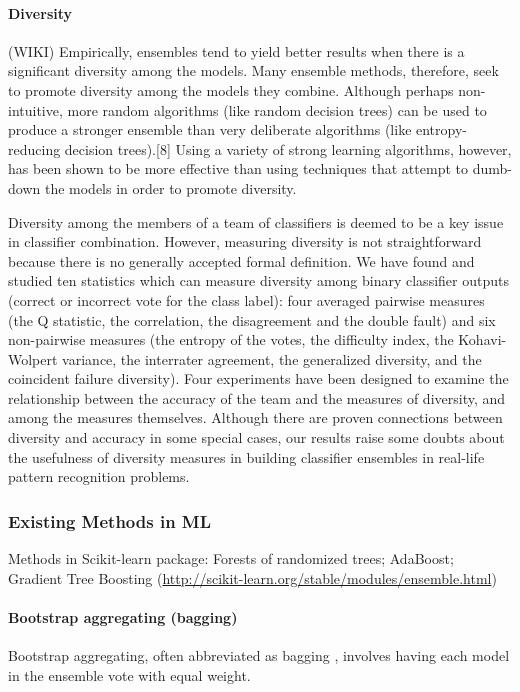 \paragraph{Diversity}

(WIKI) Empirically, ensembles tend to yield better results when there is a significant diversity among the models. Many ensemble methods, therefore, seek to promote diversity among the models they combine. Although perhaps non-intuitive, more random algorithms (like random decision trees) can be used to produce a stronger ensemble than very deliberate algorithms (like entropy-reducing decision trees).[8] Using a variety of strong learning algorithms, however, has been shown to be more effective than using techniques that attempt to dumb-down the models in order to promote diversity.


\cite{kuncheva2003measures} Diversity among the members of a team of classifiers is deemed to be a key issue in classifier
combination. However, measuring diversity is not straightforward because there is no generally accepted formal
definition. We have found and studied ten statistics which can measure diversity among binary classifier outputs
(correct or incorrect vote for the class label): four averaged pairwise measures (the Q statistic, the correlation,
the disagreement and the double fault) and six non-pairwise measures (the entropy of the votes, the difficulty
index, the Kohavi-Wolpert variance, the interrater agreement, the generalized diversity, and the coincident failure
diversity). Four experiments have been designed to examine the relationship between the accuracy of the team and
the measures of diversity, and among the measures themselves. Although there are proven connections between
diversity and accuracy in some special cases, our results raise some doubts about the usefulness of diversity
measures in building classifier ensembles in real-life pattern recognition problems.


\subsubsection{Existing Methods in ML}

Methods in Scikit-learn package: Forests of randomized trees; AdaBoost; Gradient Tree Boosting  (\url{http://scikit-learn.org/stable/modules/ensemble.html})

\paragraph{Bootstrap aggregating (bagging)}
Bootstrap aggregating, often abbreviated as bagging \cite{breiman1996bagging}, involves having each model in the ensemble vote with equal weight.

